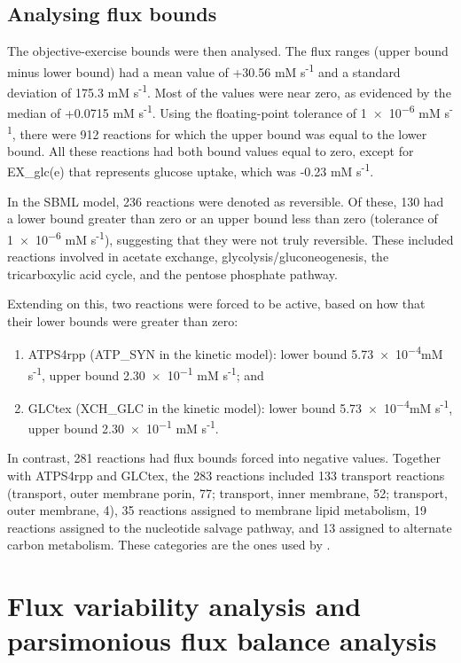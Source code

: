 \documentclass[parskip=full, numbers=noenddot]{scrreprt}
\begin{document}
\subsection{Analysing flux bounds}
\label{ssec:objectiveexercise}

The objective-exercise bounds were then analysed. The flux ranges (upper bound minus lower bound) had a mean value of +30.56 mM s\textsuperscript{-1} and a standard deviation of 175.3 mM s\textsuperscript{-1}. Most of the values were near zero, as evidenced by the median of +0.0715 mM s\textsuperscript{-1}. Using the floating-point tolerance of \num{1e-6} mM s\textsuperscript{-1}, there were 912 reactions for which the upper bound was equal to the lower bound. All these reactions had both bound values equal to zero, except for EX\_glc(e) that represents glucose uptake, which was -0.23 mM s\textsuperscript{-1}.

In the SBML model, 236 reactions were denoted as reversible. Of these, 130 had a lower bound greater than zero or an upper bound less than zero (tolerance of \num{1e-6} mM s\textsuperscript{-1}), suggesting that they were not truly reversible. These included reactions involved in acetate exchange, glycolysis/gluconeogenesis, the tricarboxylic acid cycle, and the pentose phosphate pathway.

Extending on this, two reactions were forced to be active, based on how that their lower bounds were greater than zero:
\begin{enumerate}
\item ATPS4rpp (ATP\_SYN in the kinetic model): lower bound \num{5.73e-4}mM s\textsuperscript{-1}, upper bound \num{2.30e-1} mM s\textsuperscript{-1}; and
  \item GLCtex (XCH\_GLC in the kinetic model): lower bound \num{5.73e-4}mM s\textsuperscript{-1}, upper bound \num{2.30e-1} mM s\textsuperscript{-1}.
  \end{enumerate}

  In contrast, 281 reactions had flux bounds forced into negative values. Together with ATPS4rpp and GLCtex, the 283 reactions included 133 transport reactions (transport, outer membrane porin, 77; transport, inner membrane, 52; transport, outer membrane, 4), 35 reactions assigned to membrane lipid metabolism, 19 reactions assigned to the nucleotide salvage pathway, and 13 assigned to alternate carbon metabolism. These categories are the ones used by \citet{orth_comprehensive_2011}.

  \section{Flux variability analysis and parsimonious flux balance analysis}
  \label{sec:fva}
\end{document}
